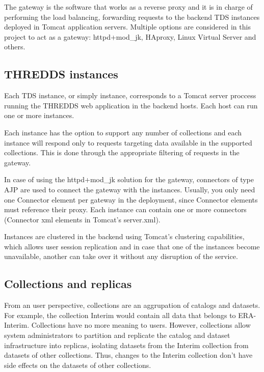 \documentclass[a4paper,12pt]{article}
\begin{document}
The gateway is the software that works as a reverse proxy and it is in charge of performing the load balancing, forwarding requests to the backend TDS instances deployed in Tomcat application servers. Multiple options are considered in this project to act as a gateway: httpd+mod\_jk, HAproxy, Linux Virtual Server and others.

\subsection{THREDDS instances}

Each TDS instance, or simply instance, corresponds to a Tomcat server proccess running the THREDDS web application in the backend hosts. Each host can run one or more instances. 

Each instance has the option to support any number of collections and each instance will respond only to requests targeting data available in the supported collections. This is done through the appropriate filtering of requests in the gateway.

In case of using the httpd+mod\_jk solution for the gateway, connectors of type AJP are used to connect the gateway with the instances. Usually, you only need one Connector element per gateway in the deployment, since Connector elements must reference their proxy.  Each instance can contain one or more connectors (Connector xml elements in Tomcat's server.xml).

Instances are clustered in the backend using Tomcat's clustering capabilities, which allows user session replication and in case that one of the instances become unavailable, another can take over it without any disruption of the service.

\subsection{Collections and replicas}

From an user perspective, collections are an aggrupation of catalogs and datasets. For example, the collection Interim would contain all data that belongs to ERA-Interim. Collections have no more meaning to users. However, collections allow system administrators to partition and replicate the catalog and dataset infrastructure into replicas, isolating datasets from the Interim collection from datasets of other collections. Thus, changes to the Interim collection don't have side effects on the datasets of other collections. 
\end{document}
